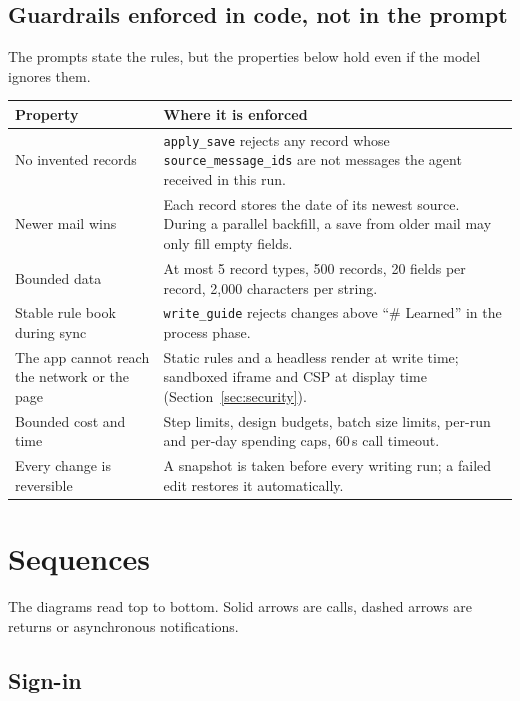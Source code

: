 \documentclass[10pt,a4paper]{article}
\newcommand{\code}[1]{\texttt{\small #1}}
\begin{document}
\subsection{Guardrails enforced in code, not in the prompt}

The prompts state the rules, but the properties below hold even if the model ignores them.

\begin{center}\small
\begin{tabularx}{\linewidth}{@{}P{4.4cm}L@{}}
\toprule
\textbf{Property} & \textbf{Where it is enforced} \\
\midrule
No invented records & \code{apply\_save} rejects any record whose \code{source\_message\_ids} are not messages the agent received in this run. \\
Newer mail wins & Each record stores the date of its newest source. During a parallel backfill, a save from older mail may only fill empty fields. \\
Bounded data & At most 5 record types, 500 records, 20 fields per record, 2,000 characters per string. \\
Stable rule book during sync & \code{write\_guide} rejects changes above ``\# Learned'' in the process phase. \\
The app cannot reach the network or the page & Static rules and a headless render at write time; sandboxed iframe and CSP at display time (Section~\ref{sec:security}). \\
Bounded cost and time & Step limits, design budgets, batch size limits, per-run and per-day spending caps, 60\,s call timeout. \\
Every change is reversible & A snapshot is taken before every writing run; a failed edit restores it automatically. \\
\bottomrule
\end{tabularx}
\end{center}

\section{Sequences}

The diagrams read top to bottom. Solid arrows are calls, dashed arrows are returns or
asynchronous notifications.

\subsection{Sign-in}
\end{document}
